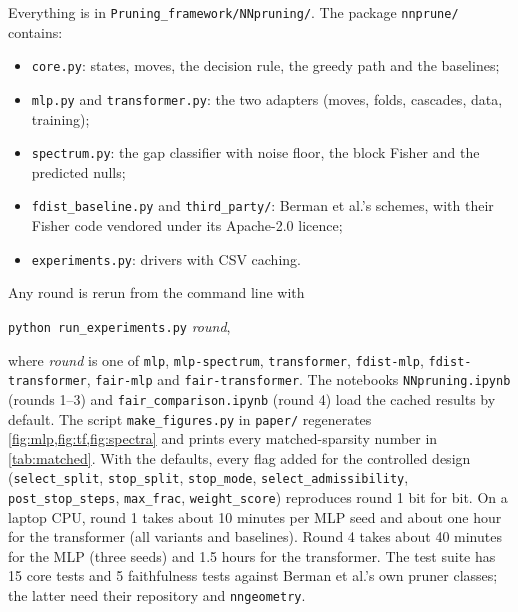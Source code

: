 \documentclass[11pt,a4paper]{article}
\theoremstyle{definition}
\newcommand{\code}[1]{\texttt{#1}}
\begin{document}
Everything is in \code{Pruning\_framework/NNpruning/}. The package \code{nnprune/}
contains:
\begin{itemize}
\item \code{core.py}: states, moves, the decision rule, the greedy path and the baselines;
\item \code{mlp.py} and \code{transformer.py}: the two adapters (moves, folds, cascades,
data, training);
\item \code{spectrum.py}: the gap classifier with noise floor, the block Fisher and the
predicted nulls;
\item \code{fdist\_baseline.py} and \code{third\_party/}: Berman et al.'s schemes, with
their Fisher code vendored under its Apache-2.0 licence;
\item \code{experiments.py}: drivers with CSV caching.
\end{itemize}
Any round is rerun from the command line with
\begin{center}\code{python run\_experiments.py} \textit{round},\end{center}
where \textit{round} is one of \code{mlp}, \code{mlp-spectrum}, \code{transformer},
\code{fdist-mlp}, \code{fdist-transformer}, \code{fair-mlp} and \code{fair-transformer}. The notebooks
\code{NNpruning.ipynb} (rounds 1--3) and \code{fair\_comparison.ipynb} (round 4) load the
cached results by default. The script \code{make\_figures.py} in \code{paper/} regenerates
\cref{fig:mlp,fig:tf,fig:spectra} and prints every matched-sparsity number in
\cref{tab:matched}. With the defaults, every flag added for the controlled design
(\code{select\_split}, \code{stop\_split}, \code{stop\_mode},
\code{select\_admissibility}, \code{post\_stop\_steps}, \code{max\_frac},
\code{weight\_score}) reproduces round 1 bit for bit. On a laptop CPU, round 1 takes about 10 minutes per MLP seed and about one hour for the
transformer (all variants and baselines). Round 4 takes about 40 minutes for the MLP
(three seeds) and 1.5 hours for the transformer. The test suite has 15 core tests and 5
faithfulness tests against Berman et al.'s own pruner classes; the latter need their
repository and \code{nngeometry}.



\end{document}
